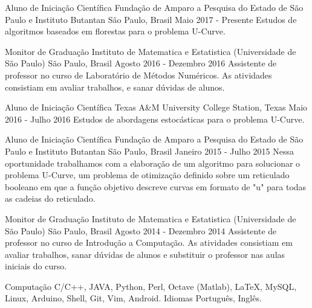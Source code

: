 \documentclass[11pt, a4paper]{awesome-cv-res}
\begin{document}
\begin{cventries}
\cventry
{Aluno de Iniciação Científica}
{Fundação de Amparo a Pesquisa do Estado de São Paulo e Instituto Butantan}
{São Paulo, Brasil}
{Maio 2017 - Presente}
{Estudos de algoritmos baseados em florestas para o problema U-Curve.}
\newline 
\newline

\cventry
{Monitor de Graduação}
{Instituto de Matematica e Estatistica (Universidade de São Paulo)} 
{São Paulo, Brasil}
{Agosto 2016 - Dezembro 2016}
{Assistente de professor no curso de Laboratório de Métodos Numéricos. As atividades consistiam em avaliar trabalhos, e sanar dúvidas de alunos.}
\newline 
\newline

\cventry
{Aluno de Iniciação Científica}
{Texas A\&M University}
{College Station, Texas}
{Maio 2016 - Julho 2016}
{Estudos de abordagens estocásticas para o problema U-Curve.}
\newline 
\newline

\cventry
{Aluno de Iniciação Científica}
{Fundação de Amparo a Pesquisa do Estado de São Paulo e Instituto Butantan}
{São Paulo, Brasil}
{Janeiro 2015 - Julho 2015}
{Nessa oportunidade trabalhamos com a elaboração de um algoritmo para solucionar o problema U-Curve, um problema de otimização definido sobre um reticulado booleano em que a função objetivo descreve curvas em formato de "u" para todas as cadeias do reticulado.}
\newline 
\newline

\cventry
{Monitor de Graduação} 
{Instituto de Matematica e Estatistica (Universidade de São Paulo)} 
{São Paulo, Brasil}
{Agosto 2014 - Dezembro 2014}
{Assistente de professor no curso de Introdução a Computação. As atividades consistiam em avaliar trabalhos, sanar dúvidas de alunos e substituir o professor nas aulas iniciais do curso.}
\end{cventries}

\begin{cvskills}
\cvskill
{Computação} %
{C/C++, JAVA, Python, Perl, Octave (Matlab), LaTeX, MySQL, Linux, 
Arduino, Shell, Git, Vim, Android.} %
\cvskill
{Idiomas} %
{Português, Inglês.} %

\end{cvskills}
\end{document}
